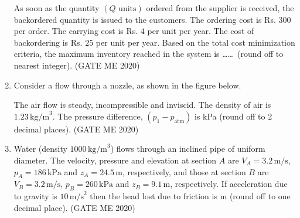 \documentclass[journal]{IEEEtran}
\begin{document}
\begin{enumerate}
As soon as the quantity $(Q \text{ units})$ ordered from the supplier is received, the backordered quantity is issued to the customers. The ordering cost is Rs. $300$ per order. The carrying cost is Rs. $4$ per unit per year. The cost of backordering is Rs. $25$ per unit per year. Based on the total cost minimization criteria, the maximum inventory reached in the system is \ldots\ldots \ (round off to nearest integer). \hfill (GATE ME 2020)

\item Consider a flow through a nozzle, as shown in the figure below. 

\begin{center}
%
\end{center}


The air flow is steady, incompressible and inviscid. The density of air is $1.23 \, \text{kg/m}^3$. The pressure difference, $(p_1 - p_{\text{atm}})$ is \underline{\hspace{3cm}} kPa (round off to 2 decimal places). \hfill (GATE ME 2020)

\item
Water (density $1000 \, \text{kg/m}^3$) flows through an inclined pipe of uniform diameter. The velocity, pressure and elevation at section $A$ are $V_A = 3.2 \, \text{m/s}$, $p_A = 186 \, \text{kPa}$ and $z_A = 24.5 \, \text{m}$, respectively, and those at section $B$ are $V_B = 3.2 \, \text{m/s}$, $p_B = 260 \, \text{kPa}$ and $z_B = 9.1 \, \text{m}$, respectively. If acceleration due to gravity is $10 \, \text{m/s}^2$ then the head lost due to friction is \underline{\hspace{3cm}} m (round off to one decimal place). \hfill (GATE ME 2020)


\end{enumerate}
\end{document}
